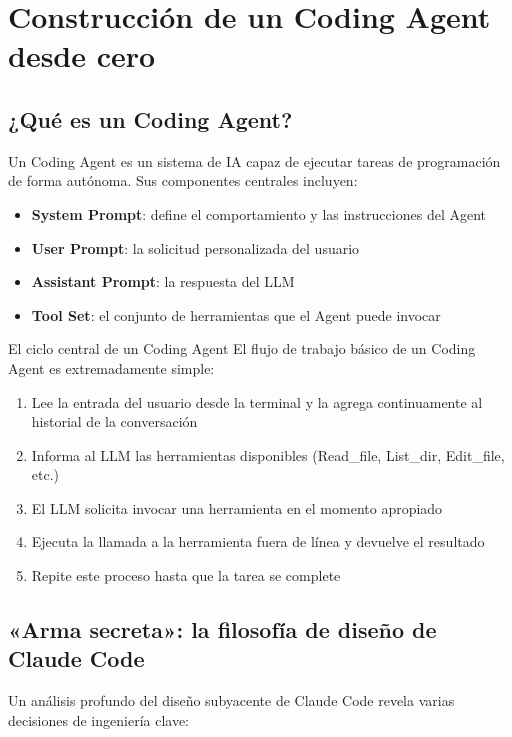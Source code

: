 \section{Construcción de un Coding Agent desde cero}

\subsection{¿Qué es un Coding Agent?}

Un Coding Agent es un sistema de IA capaz de ejecutar tareas de programación de forma autónoma. Sus componentes centrales incluyen:

\begin{itemize}
    \item \textbf{System Prompt}: define el comportamiento y las instrucciones del Agent
    \item \textbf{User Prompt}: la solicitud personalizada del usuario
    \item \textbf{Assistant Prompt}: la respuesta del LLM
    \item \textbf{Tool Set}: el conjunto de herramientas que el Agent puede invocar
\end{itemize}

\begin{importantbox}{El ciclo central de un Coding Agent}
El flujo de trabajo básico de un Coding Agent es extremadamente simple:
\begin{enumerate}
    \item Lee la entrada del usuario desde la terminal y la agrega continuamente al historial de la conversación
    \item Informa al LLM las herramientas disponibles (Read\_file, List\_dir, Edit\_file, etc.)
    \item El LLM solicita invocar una herramienta en el momento apropiado
    \item Ejecuta la llamada a la herramienta fuera de línea y devuelve el resultado
    \item Repite este proceso hasta que la tarea se complete
\end{enumerate}
\end{importantbox}

\subsection{«Arma secreta»: la filosofía de diseño de Claude Code}

Un análisis profundo del diseño subyacente de Claude Code revela varias decisiones de ingeniería clave:

